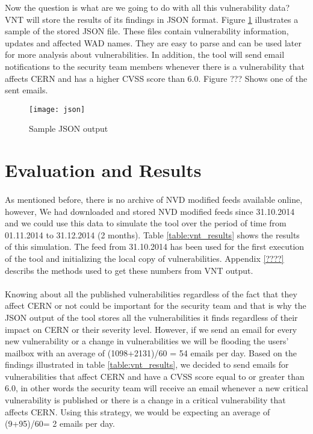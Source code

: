 Now the question is what are we going to do with all this vulnerability data? VNT will store the results of its findings in JSON format. Figure \ref{figure:json_output} illustrates a sample of the stored JSON file. These files contain vulnerability information, updates and affected WAD names. They are easy to parse and can be used later for more analysis about vulnerabilities.
In addition, the tool will send email notifications to the security team members whenever there is a vulnerability that affects CERN and has a higher CVSS score than 6.0. Figure ??? Shows one of the sent emails.
\\
\begin{figure}[h!]
\label{figure:json_output}
  \centering
    \texttt{[image: json]}
  \caption{Sample JSON output}
\end{figure}


\section{Evaluation and Results}

\paragraph{}
As mentioned before, there is no archive of NVD modified feeds available online, however, We had downloaded and stored NVD modified feeds since 31.10.2014 and we could use this data to simulate the tool over the period of time from 01.11.2014 to 31.12.2014 (2 months). Table \ref{table:vnt_results} shows the results of this simulation. The feed from 31.10.2014 has been used for the first execution of the tool and initializing the local copy of vulnerabilities. Appendix \ref{????} describs the methods used to get these numbers from VNT output.
\paragraph{}
Knowing about all the published vulnerabilities regardless of the fact that they affect CERN or not could be important for the security team and that is why the JSON output of the tool stores all the vulnerabilities it finds regardless of their impact on CERN or their severity level. However, if we send an email for every new vulnerability or a change in vulnerabilities we will be flooding the users' mailbox with an average of (1098+2131)/60 = 54 emails per day. Based on the findings illustrated in table \ref{table:vnt_results}, we decided to send emails for vulnerabilities that affect CERN and have a CVSS score equal to or greater than 6.0, in other words the security team will receive an email whenever a new critical vulnerability is published or there is a change in a critical vulnerability that affects CERN. Using this strategy, we would be expecting an average of (9+95)/60= 2 emails per day. 
